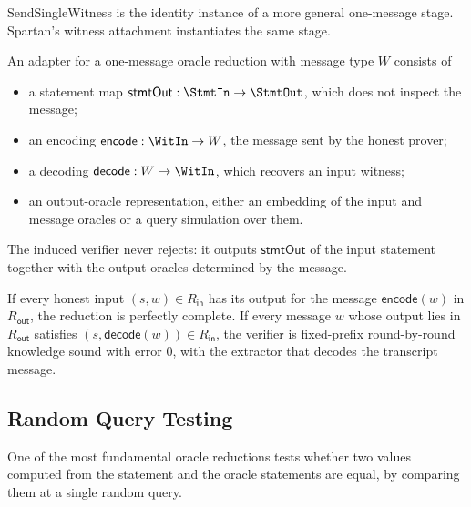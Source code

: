 SendSingleWitness is the identity instance of a more general one-message stage. Spartan's witness attachment instantiates the same stage.

\begin{definition}
    \label{def:sendsinglewitness_adapter}
    An adapter for a one-message oracle reduction with message type $W$ consists of
    \begin{itemize}
        \item a statement map $\mathsf{stmtOut} : \StmtIn \to \StmtOut$, which does not inspect the message;
        \item an encoding $\mathsf{encode} : \WitIn \to W$, the message sent by the honest prover;
        \item a decoding $\mathsf{decode} : W \to \WitIn$, which recovers an input witness;
        \item an output-oracle representation, either an embedding of the input and message oracles or a query simulation over them.
    \end{itemize}
    The induced verifier never rejects: it outputs $\mathsf{stmtOut}$ of the input statement together with the output oracles determined by the message.
    \leanok
\end{definition}

\begin{theorem}
    If every honest input $(s, w) \in R_{\mathsf{in}}$ has its output for the message $\mathsf{encode}(w)$ in $R_{\mathsf{out}}$, the reduction is perfectly complete. If every message $w$ whose output lies in $R_{\mathsf{out}}$ satisfies $(s, \mathsf{decode}(w)) \in R_{\mathsf{in}}$, the verifier is fixed-prefix round-by-round knowledge sound with error $0$, with the extractor that decodes the transcript message.
    \leanok
\end{theorem}

\subsection{Random Query Testing}

One of the most fundamental oracle reductions tests whether two values computed from the statement and the oracle statements are equal, by comparing them at a single random query.

